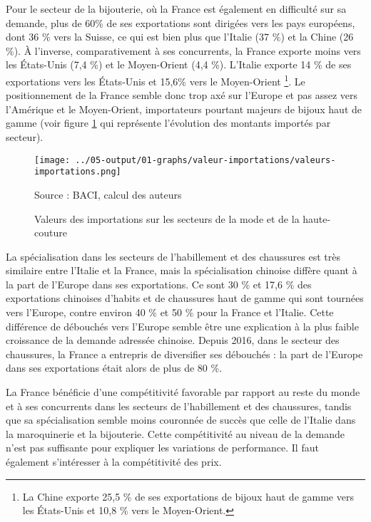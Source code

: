 \documentclass[french,10pt,a4paper]{article}
\begin{document}
Pour le secteur de la bijouterie, où la France est également en difficulté sur sa demande, plus de 60\% de ses exportations sont dirigées vers les pays européens, dont 36 \% vers la Suisse, ce qui est bien plus que l'Italie (37 \%) et la Chine (26 \%). À l'inverse, comparativement à ses concurrents, la France exporte moins vers les États-Unis (7,4 \%) et le Moyen-Orient (4,4 \%). L'Italie exporte 14 \% de ses exportations vers les États-Unis et 15,6\% vers le Moyen-Orient \footnote{La Chine exporte 25,5 \% de ses exportations de bijoux haut de gamme vers les États-Unis et 10,8 \% vers le Moyen-Orient.}. Le positionnement de la France semble donc trop axé sur l'Europe et pas assez vers l'Amérique et le Moyen-Orient, importateurs pourtant majeurs de bijoux haut de gamme (voir figure \ref{fig:valeurs-importations} qui représente l'évolution des montants importés par secteur).

\begin{figure}[!h]
  \centering
  \texttt{[image: ../05-output/01-graphs/valeur-importations/valeurs-importations.png]}
  \captionsetup{justification=raggedright,singlelinecheck=false, font=small}
  \caption*{Source : BACI, calcul des auteurs}
  \captionsetup{justification=centering, singlelinecheck=true, font=normalsize}
  \caption{Valeurs des importations sur les secteurs de la mode et de la haute-couture}
  \label{fig:valeurs-importations}
\end{figure}

La spécialisation dans les secteurs de l'habillement et des chaussures est très similaire entre l'Italie et la France, mais la spécialisation chinoise diffère quant à la part de l'Europe dans ses exportations. Ce sont 30 \% et 17,6 \% des exportations chinoises d'habits et de chaussures haut de gamme qui sont tournées vers l'Europe, contre environ 40 \% et 50 \% pour la France et l’Italie. Cette différence de débouchés vers l'Europe semble être une explication à la plus faible croissance de la demande adressée chinoise. Depuis 2016, dans le secteur des chaussures, la France a entrepris de diversifier ses débouchés : la part de l'Europe dans ses exportations était alors de plus de 80 \%.


La France bénéficie d'une compétitivité favorable par rapport au reste du monde et à ses concurrents dans les secteurs de l'habillement et des chaussures, tandis que sa spécialisation semble moins couronnée de succès que celle de l'Italie dans la maroquinerie et la bijouterie. Cette compétitivité au niveau de la demande n'est pas suffisante pour expliquer les variations de performance. Il faut également s'intéresser à la compétitivité des prix.
\end{document}
